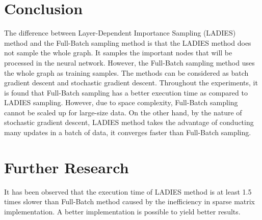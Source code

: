\chapter{Conclusion}

The difference between Layer-Dependent Importance Sampling (LADIES) method and the Full-Batch sampling method is that the LADIES method does not sample the whole graph. It samples the important nodes that will be processed in the neural network. However, the Full-Batch sampling method uses the whole graph as training samples. The methods can be considered as batch gradient descent and stochastic gradient descent. Throughout the experiments, it is found that Full-Batch sampling has a better execution time as compared to LADIES sampling. However, due to space complexity, Full-Batch sampling cannot be scaled up for large-size data. On the other hand, by the nature of stochastic gradient descent, LADIES method takes the advantage of conducting many updates in a batch of data, it converges faster than Full-Batch sampling.

\chapter{Further Research}

It has been observed that the execution time of LADIES method is at least 1.5 times slower than Full-Batch method caused by the inefficiency in sparse matrix implementation. A better implementation is possible to yield better results.